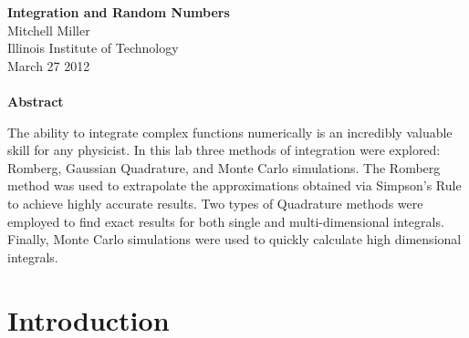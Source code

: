 \documentclass[12pt]{article}
\begin{document}
\begin{center}
\textbf{Integration and Random Numbers} \\ 
Mitchell Miller \\
Illinois Institute of Technology \\
March  27 2012 {\ \\ \ \\}
\textbf{Abstract}\\
\end{center}
\noindent
The ability to integrate complex functions numerically is an incredibly valuable skill for any physicist.  In this lab three methods of integration were explored:  Romberg, Gaussian Quadrature, and Monte Carlo simulations.  The Romberg method was used to extrapolate the approximations obtained via Simpson's Rule to achieve highly accurate results.  Two types of Quadrature methods were employed to find exact results for both single and multi-dimensional integrals.  Finally, Monte Carlo simulations were used to quickly calculate high dimensional integrals.
\pagebreak
\section{Introduction}
\end{document}
